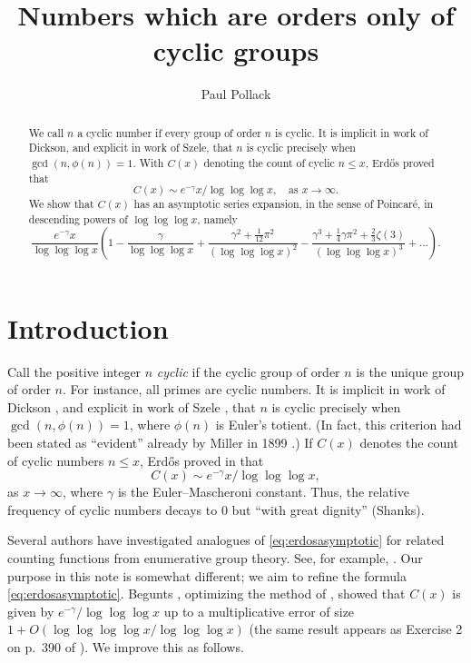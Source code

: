 \documentclass[11pt]{amsart}
\author{Paul Pollack}
\title{Numbers which are orders only of cyclic groups}
\theoremstyle{remark}
\begin{document}
\renewcommand{\labelenumi}{(\roman{enumi})}
\def\Ll{\mathcal{L}}
\def\N{\mathbb{N}}
\def\Aa{\mathcal{A}}
\def\Q{\mathbb{Q}}
\newcommand\rad{\mathrm{rad}}
\def\Z{\mathbb{Z}}
\def\F{\mathbb{F}}
\def\R{\mathbb{R}}
\def\C{\mathbb{C}}
\def\Pp{\mathcal{P}}
\def\Ss{\mathcal{S}}
\newcommand\Li{\mathrm{Li}}
\begin{abstract} We call $n$ a \textsf{cyclic number} if every group of order $n$ is cyclic. It is implicit in work of Dickson, and explicit in work of Szele, that $n$ is cyclic precisely when $\gcd(n,\phi(n))=1$. With $C(x)$ denoting the count of cyclic $n\le x$, Erd\H{o}s proved that
\[ C(x) \sim e^{-\gamma} x/\log\log\log{x}, \quad\text{as $x\to\infty$}. \]
We show that $C(x)$ has an asymptotic series expansion, in the sense of Poincar\'e, in descending powers of $\log\log\log{x}$, namely
\[ \frac{e^{-\gamma} x}{\log\log\log{x}} \left(1-\frac{\gamma}{\log\log\log{x}} + \frac{\gamma^2 + \frac{1}{12}\pi^2}{(\log\log\log{x})^2} - \frac{\gamma^3 +\frac{1}{4} \gamma \pi^2 + \frac{2}{3}\zeta(3)}{(\log\log\log{x})^3} + \dots \right). \]
\end{abstract}

\maketitle


\section{Introduction}
Call the positive integer $n$ \emph{cyclic} if the cyclic group of order $n$ is the unique group of order $n$. For instance, all primes are cyclic numbers. It is implicit in work of Dickson \cite{dickson05}, and explicit in work of Szele \cite{szele47}, that $n$ is cyclic precisely when $\gcd(n,\phi(n))=1$, where $\phi(n)$ is Euler's totient. (In fact, this criterion had been stated as ``evident'' already by Miller in 1899 \cite[p.\ 235]{miller99}.) If $C(x)$ denotes the count of cyclic numbers $n\le x$, Erd\H{o}s proved in \cite{erdos48} that
\begin{equation}\label{eq:erdosasymptotic} C(x) \sim e^{-\gamma} x/\log\log\log{x}, \end{equation}
as $x\to\infty$, where $\gamma$ is the Euler--Mascheroni constant. Thus, the relative frequency of cyclic numbers decays to $0$ but ``with great dignity'' (Shanks).

Several authors have investigated analogues of \eqref{eq:erdosasymptotic} for related counting functions from enumerative group theory. See, for example, \cite{mays79, MM84, warlimont85, srinivasan87, EMM87, EM88, NS88, srinivasan91, NP18}. Our purpose in this note is somewhat different; we aim to refine the formula \eqref{eq:erdosasymptotic}. Begunts \cite{begunts01}, optimizing the method of \cite{erdos48}, showed that $C(x)$ is given by $e^{-\gamma}/\log\log\log{x}$ up to a multiplicative error of size $1+O(\log\log\log\log{x}/\log\log\log{x})$  (the same result appears as Exercise 2 on p.\ 390 of \cite{MV07}). We improve this as follows.
\end{document}

